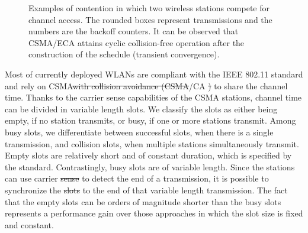 \documentclass[journal]{IEEEtran}
\providecommand{\DIFadd}[1]{{\protect\color{blue}\uwave{#1}}} %
\providecommand{\DIFdel}[1]{{\protect\color{red}\sout{#1}}}                      %
\providecommand{\DIFaddbegin}{} %
\providecommand{\DIFaddend}{} %
\providecommand{\DIFdelbegin}{} %
\providecommand{\DIFdelend}{} %
\begin{document}
\begin{figure}[!t]
\centering
{}
\caption{Examples of contention in which two wireless stations compete for channel access. The rounded boxes represent transmissions and the numbers are the backoff counters. It can be observed that CSMA/ECA attains cyclic collision-free operation after the construction of the schedule (transient convergence).}
\label{fig:ca_vs_eca}
\end{figure}

Most of \DIFaddbegin \DIFadd{the }\DIFaddend currently deployed WLANs are compliant with the IEEE 802.11 standard and rely on CSMA\DIFdelbegin \DIFdel{with collision avoidance (CSMA}\DIFdelend /CA \DIFdelbegin \DIFdel{) }\DIFdelend to share the channel time.
Thanks to the carrier sense capabilities of the CSMA stations, channel time can be divided in variable length slots.
We classify the slots as either being empty, if no station transmits, or busy, if one or more stations transmit.
Among busy slots, we differentiate between successful slots, when there is a single transmission, and collision slots, when multiple stations simultaneously transmit.
Empty slots are relatively short and of constant duration, which is specified by the standard.
Contrastingly, busy slots are of variable length. 
Since the stations can use carrier \DIFdelbegin \DIFdel{sense }\DIFdelend \DIFaddbegin \DIFadd{sensing }\DIFaddend to detect the end of a transmission, it is possible to synchronize the \DIFdelbegin \DIFdel{slots }\DIFdelend \DIFaddbegin \DIFadd{nodes }\DIFaddend to the end of that variable length transmission.
The fact that the empty slots can be orders of magnitude shorter than the busy slots represents a performance gain over those approaches in which the slot size is fixed and constant.
\end{document}
